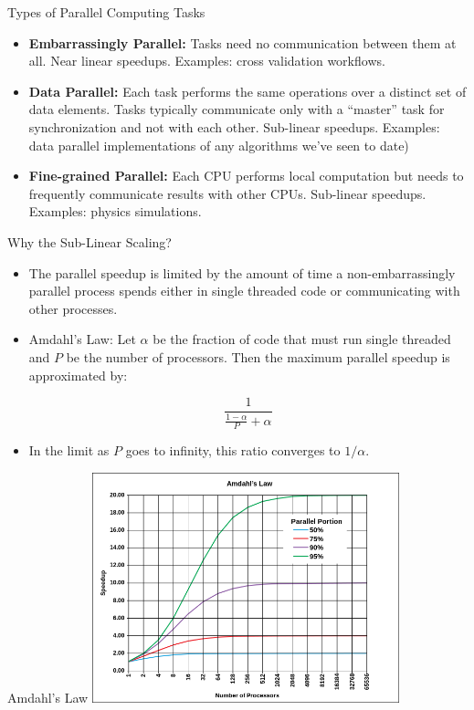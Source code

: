 \documentclass[serif,xcolor=pdftex,dvipsnames,table,hyperref={bookmarks=false,breaklinks}]{beamer}
\begin{document}
\begin{frame}[t]{Types of Parallel Computing Tasks}
\begin{itemize}
\item \textbf{Embarrassingly Parallel:} Tasks need no communication between 
them at all. Near linear speedups. Examples: \pause cross validation workflows.

\pause\item \textbf{Data Parallel:} Each task performs the same operations over 
a distinct set of data elements. Tasks typically communicate only with a 
``master'' task for synchronization and not with each other. Sub-linear 
speedups. Examples: \pause data parallel 
implementations of any algorithms we've seen to date)

\pause\item \textbf{Fine-grained Parallel:} Each CPU performs local computation
but needs to frequently communicate results with other CPUs. Sub-linear 
speedups. Examples: \pause physics simulations.

\end{itemize}
\end{frame}

\begin{frame}[t]{Why the Sub-Linear Scaling?}
\begin{itemize}
\item The parallel speedup is limited by the amount of time a 
non-embarrassingly parallel process spends either in single threaded code or 
communicating with other processes.

\pause \item Amdahl's Law: Let $\alpha$ be the fraction of code that must run 
single threaded and $P$ be the number of processors. Then the maximum parallel 
speedup
is approximated by:

{\Large
$$\frac{1}{\frac{1-\alpha}{P} + \alpha}$$
}

\pause \item In the limit as $P$ goes to infinity, this ratio converges to 
$1/\alpha$.

\end{itemize}
\end{frame}

\begin{frame}[t]{Amdahl's Law}
\center
\includegraphics[width=3.5in]{../Figures/AmdahlsLaw.png}\\
\end{frame}
\end{document}
